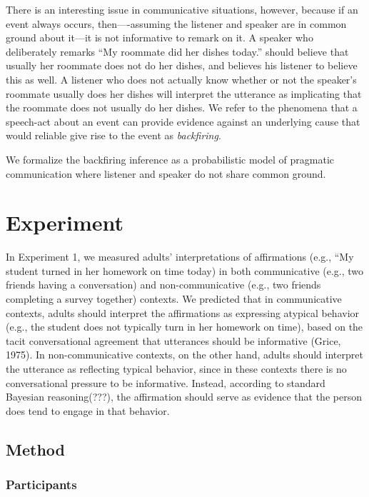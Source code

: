 \documentclass[10pt,letterpaper]{article}
\begin{document}
There is an interesting issue in communicative situations, however, because if an event always occurs, then----assuming the listener and speaker are in common ground about it---it is not informative to remark on it. 
A speaker who deliberately remarks ``My roommate did her dishes today.'' should believe that usually her roommate does not do her dishes, and believes his listener to believe this as well. 
A listener who does not actually know whether or not the speaker's roommate usually does her dishes will interpret the utterance as implicating that the roommate does not usually do her dishes.
We refer to the phenomena that a speech-act about an event can provide evidence against an underlying cause that would reliable give rise to the event as \emph{backfiring}. 

We formalize the backfiring inference as a probabilistic model of pragmatic communication where listener and speaker do not share common ground. 




\section{Experiment}

	In Experiment 1, we measured adults’ interpretations of affirmations (e.g., “My student turned in her homework on time today) in both communicative (e.g., two friends having a conversation) and non-communicative (e.g., two friends completing a survey together) contexts.  We predicted that in communicative contexts, adults should interpret the affirmations as expressing atypical behavior (e.g., the student does not typically turn in her homework on time), based on the tacit conversational agreement that utterances should be informative (Grice, 1975).  In non-communicative contexts, on the other hand, adults should interpret the utterance as reflecting typical behavior, since in these contexts there is no conversational pressure to be informative.  Instead, according to standard Bayesian reasoning(???), the affirmation should serve as evidence that the person does tend to engage in that behavior.

\subsection{Method}

\subsubsection{Participants}
\end{document}
